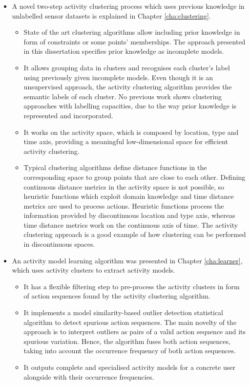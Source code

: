 \begin{itemize}
 \item A novel two-step activity clustering process which uses previous knowledge in unlabelled sensor datasets is explained in Chapter \ref{cha:clustering}. %
 \begin{itemize}
  \item State of the art clustering algorithms allow including prior knowledge in form of constraints or some points' memberships. The approach presented in this dissertation specifies prior knowledge as incomplete models.
  \item It allows grouping data in clusters and recognises each cluster's label using previously given incomplete models. Even though it is an unsupervised approach, the activity clustering algorithm provides the semantic labels of each cluster. No previous work shows clustering approaches with labelling capacities, due to the way prior knowledge is represented and incorporated.
  \item It works on the activity space, which is composed by location, type and time axis, providing a meaningful low-dimensional space for efficient activity clustering.
  \item Typical clustering algorithms define distance functions in the corresponding space to group points that are close to each other. Defining continuous distance metrics in the activity space is not possible, so heuristic functions which exploit domain knowledge and time distance metrics are used to process actions. Heuristic functions process the information provided by discontinuous location and type axis, whereas time distance metrics work on the continuous axis of time. The activity clustering approach is a good example of how clustering can be performed in discontinuous spaces.
 \end{itemize}

 \item An activity model learning algorithm was presented in Chapter \ref{cha:learner}, which uses activity clusters to extract activity models. %
 \begin{itemize}
  \item It has a flexible filtering step to pre-process the activity clusters in form of action sequences found by the activity clustering algorithm.
  \item It implements a model similarity-based outlier detection statistical algorithm to detect spurious action sequences. The main novelty of the approach is to interpret outliers as pairs of a valid action sequence and its spurious variation. Hence, the algorithm fuses both action sequences, taking into account the occurrence frequency of both action sequences.
  \item It outputs complete and specialised activity models for a concrete user alongside with their occurrence frequencies.
 \end{itemize}


\end{itemize}
